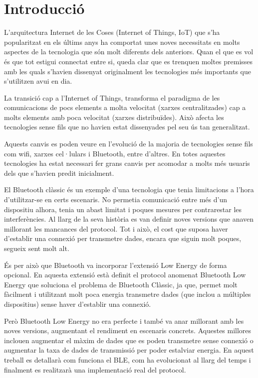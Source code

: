 \cleardoublepage
{}
\chapter*{Introducció}
L'arquitectura Internet de les Coses (Internet of Things, IoT) que s'ha popularitzat en els últims anys ha comportat unes noves necessitats en molts aspectes de la tecnologia que són molt diferents dels anteriors.
Quan el que es vol és que tot estigui connectat entre si, queda clar que es trenquen moltes premisses amb les quals s'havien dissenyat originalment les tecnologies més importants que s'utilitzen avui en dia.

La transició cap a l'Internet of Things, transforma el paradigma de les comunicacions de pocs elements a molta velocitat (xarxes centralitzades) cap a molts elements amb poca velocitat (xarxes distribuïdes).
Això afecta les tecnologies sense fils que no havien estat dissenyades pel seu ús tan generalitzat.

Aquests canvis es poden veure en l'evolució de la majoria de tecnologies sense fils com wifi, xarxes cel·lulars i Bluetooth, entre d'altres.
En totes aquestes tecnologies ha estat necessari fer grans canvis per acomodar a molts més usuaris dels que s'havien predit inicialment.

El Bluetooth clàssic és un exemple d'una tecnologia que tenia limitacions a l'hora d'utilitzar-se en certs escenaris.
No permetia comunicació entre més d'un dispositiu alhora, tenia un abast limitat i poques mesures per contrarestar les interferències.
Al llarg de la seva història es van definir noves versions que anaven millorant les mancances del protocol.
Tot i això, el cost que suposa haver d'establir una connexió per transmetre dades, encara que siguin molt poques, segueix sent molt alt.

És per això que Bluetooth va incorporar l'extensió Low Energy de forma opcional.
En aquesta extensió està definit el protocol anomenat Bluetooth Low Energy que soluciona el problema de Bluetooth Clàssic, ja que, permet molt fàcilment i utilitzant molt poca energia transmetre dades (que inclou a múltiples dispositius) sense haver d'establir una connexió.

Però Bluetooth Low Energy no era perfecte i també va anar millorant amb les noves versions, augmentant el rendiment en escenaris concrets.
Aquestes millores inclouen augmentar el màxim de dades que es poden transmetre sense connexió o augmentar la taxa de dades de transmissió per poder estalviar energia.
En aquest treball es detallarà com funciona el BLE, com ha evolucionat al llarg del temps i finalment es realitzarà una implementació real del protocol.
